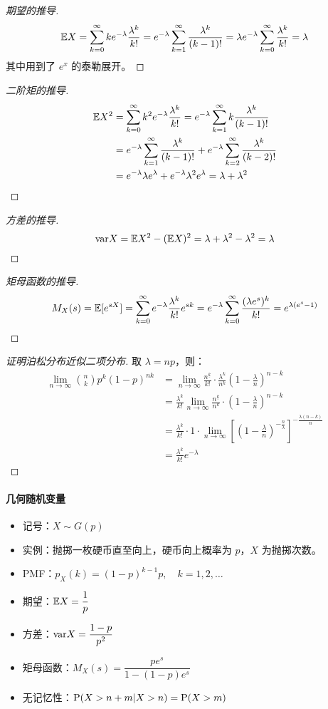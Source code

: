 \begin{proof}[期望的推导]
\[
\mathbb{E} X=\sum_{k=0}^\infty ke^{-\lambda}\frac{\lambda^k}{k!}=e^{-\lambda}\sum_{k=1}^{\infty}\frac{\lambda^k}{(k-1)!}=\lambda e^{-\lambda}\sum_{k=0}^{\infty}\frac{\lambda^k}{k!}=\lambda
\]
其中用到了 $e^x$ 的泰勒展开。
\end{proof}
\begin{proof}[二阶矩的推导]
\begin{align*}
\mathbb{E} X^2&=\sum_{k=0}^\infty k^2e^{-\lambda}\frac{\lambda^k}{k!}=e^{-\lambda}\sum_{k=1}^{\infty}k\frac{\lambda^k}{(k-1)!}\\
&=e^{-\lambda}\sum_{k=1}^{\infty}\frac{\lambda^k}{(k-1)!}+e^{-\lambda}\sum_{k=2}^{\infty}\frac{\lambda^k}{(k-2)!}\\
&=e^{-\lambda}\lambda e^\lambda+e^{-\lambda}\lambda^2 e^\lambda=\lambda+\lambda^2
\end{align*}
\end{proof}
\begin{proof}[方差的推导]
\[
\mathrm{var} X=\mathbb{E} X^2-(\mathbb{E} X)^2=\lambda+\lambda^2-\lambda^2=\lambda
\]
\end{proof}
\begin{proof}[矩母函数的推导]
\[
M_X(s)=\mathbb{E}[e^{sX}]=\sum_{k=0}^\infty e^{-\lambda}\frac{\lambda^k}{k!}e^{sk}=e^{-\lambda}\sum_{k=0}^\infty \frac{(\lambda e^s)^k}{k!}=e^{\lambda(e^s-1)}
\]
\end{proof}
\begin{proof}[证明泊松分布近似二项分布]
取 $\lambda=np$，则：
\begin{align*}
\lim_{n\to\infty}\binom{n}{k}p^k(1-p)^{nk}&=\lim_{n\to\infty}\frac{n^{\underline{k}}}{k!}\cdot\frac{\lambda^k}{n^k}\left(1-\frac{\lambda}{n}\right)^{n-k}\\
&=\frac{\lambda^k}{k!}\lim_{n\to\infty}\frac{n^{\underline{k}}}{n^k}\cdot\left(1-\frac{\lambda}{n}\right)^{n-k}\\
&=\frac{\lambda^k}{k!}\cdot 1\cdot\lim_{n\to\infty}\left[\left(1-\frac{\lambda}{n}\right)^{-\frac{n}{\lambda}}\right]^{-\frac{\lambda(n-k)}{n}}\\
&=\frac{\lambda^k}{k!}e^{-\lambda}
\end{align*}
\end{proof}

\paragraph{几何随机变量}

\begin{itemize}[itemsep=1ex]
    \item 记号：$X\sim G(p)$
    \item 实例：抛掷一枚硬币直至向上，硬币向上概率为 $p$，$X$ 为抛掷次数。
    \item PMF：$p_X(k)=(1-p)^{k-1}p,\quad k=1,2,\ldots$
    \item 期望：$\mathbb{E} X=\dfrac{1}{p}$
    \item 方差：$\mathrm{var} X=\dfrac{1-p}{p^2}$
    \item 矩母函数：$M_X(s)=\dfrac{pe^s}{1-(1-p)e^s}$
    \item 无记忆性：$\mathrm{P}(X>n+m\vert X>n)=\mathrm{P}(X>m)$
\end{itemize}

